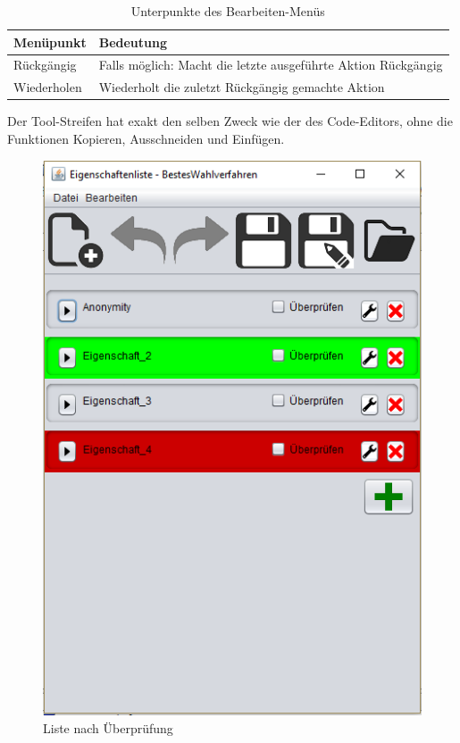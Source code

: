 \documentclass[a4paper]{scrreprt}
\begin{document}
\begin{table}[H]
\begin{tabular}{|p{3cm}|p{12cm}|}
Menüpunkt & Bedeutung \\
\hline
Rückgängig & Falls möglich: Macht die letzte ausgeführte Aktion Rückgängig \\
Wiederholen & Wiederholt die zuletzt Rückgängig gemachte Aktion 
\end{tabular}
\label{Eigenschaftenliste-Bearbeiten-Menüpunkte}
\caption{Unterpunkte des Bearbeiten-Menüs}
\end{table}

Der Tool-Streifen hat exakt den selben Zweck wie der des Code-Editors, ohne die Funktionen Kopieren, Ausschneiden und Einfügen.

\begin{figure}[H]
\begin{minipage}{.5\textwidth}
  \centering
  \includegraphics[scale=0.5]{nach-testen.png}
  \caption{Liste nach Überprüfung}
  \label{fig:sub1}
\end{minipage}

\end{figure}
\end{document}
